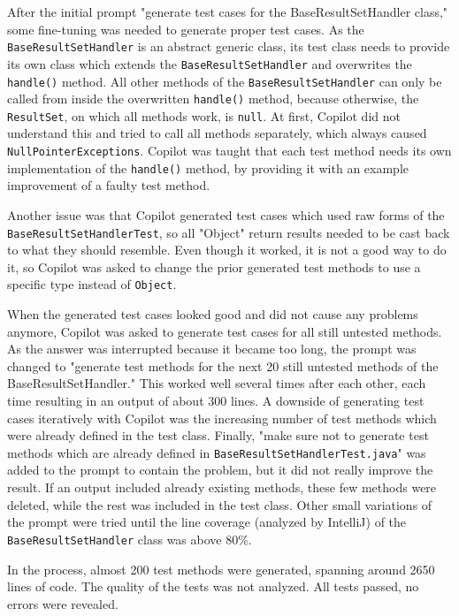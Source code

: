 \documentclass[sigconf]{acmart}
\begin{document}
After the initial prompt "generate test cases for the BaseResultSetHandler class," some fine-tuning was needed to generate proper test cases. As the \texttt{BaseResultSetHandler} is an abstract generic class, its test class needs to provide its own class which extends the \texttt{BaseResultSetHandler} and overwrites the \texttt{handle()} method. All other methods of the \texttt{BaseResultSetHandler} can only be called from inside the overwritten \texttt{handle()} method, because otherwise, the \texttt{ResultSet}, on which all methods work, is \texttt{null}. At first, Copilot did not understand this and tried to call all methods separately, which always caused \texttt{NullPointerExceptions}. Copilot was taught that each test method needs its own implementation of the \texttt{handle()} method, by providing it with an example improvement of a faulty test method.

Another issue was that Copilot generated test cases which used raw forms of the \texttt{BaseResultSetHandlerTest}, so all "Object" return results needed to be cast back to what they should resemble. Even though it worked, it is not a good way to do it, so Copilot was asked to change the prior generated test methods to use a specific type instead of \texttt{Object}.

When the generated test cases looked good and did not cause any problems anymore, Copilot was asked to generate test cases for all still untested methods. As the answer was interrupted because it became too long, the prompt was changed to "generate test methods for the next 20 still untested methods of the BaseResultSetHandler." This worked well several times after each other, each time resulting in an output of about 300 lines. A downside of generating test cases iteratively with Copilot was the increasing number of test methods which were already defined in the test class. Finally, "make sure not to generate test methods which are already defined in \texttt{BaseResultSetHandlerTest.java}" was added to the prompt to contain the problem, but it did not really improve the result. If an output included already existing methods, these few methods were deleted, while the rest was included in the test class. Other small variations of the prompt were tried until the line coverage (analyzed by IntelliJ) of the \texttt{BaseResultSetHandler} class was above 80\%.

In the process, almost 200 test methods were generated, spanning around 2650 lines of code. The quality of the tests was not analyzed. All tests passed, no errors were revealed.
\end{document}
